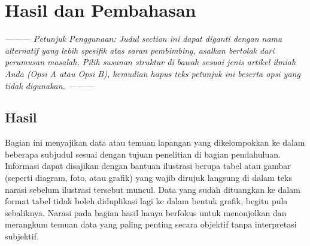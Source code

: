 \section{Hasil dan Pembahasan}

\textit{--------- Petunjuk Penggunaan: Judul section ini dapat diganti dengan nama alternatif yang lebih spesifik atas saran pembimbing, asalkan bertolak dari perumusan masalah. Pilih susunan struktur di bawah sesuai jenis artikel ilmiah Anda (Opsi A atau Opsi B), kemudian hapus teks petunjuk ini beserta opsi yang tidak digunakan. ---------}

\subsection{Hasil}
Bagian ini menyajikan data atau temuan lapangan yang dikelompokkan ke dalam beberapa subjudul sesuai dengan tujuan penelitian di bagian pendahuluan. Informasi dapat disajikan dengan bantuan ilustrasi berupa tabel atau gambar (seperti diagram, foto, atau grafik) yang wajib dirujuk langsung di dalam teks narasi sebelum ilustrasi tersebut muncul. Data yang sudah dituangkan ke dalam format tabel tidak boleh diduplikasi lagi ke dalam bentuk grafik, begitu pula sebaliknya. Narasi pada bagian hasil hanya berfokus untuk menonjolkan dan merangkum temuan data yang paling penting secara objektif tanpa interpretasi subjektif.

